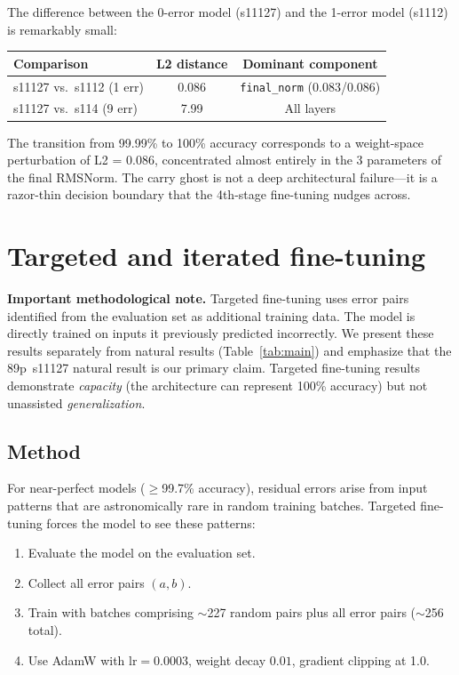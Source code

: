 \documentclass[11pt]{article}
\begin{document}
The difference between the 0-error model (s11127) and the 1-error model
(s1112) is remarkably small:

\begin{center}
\begin{tabular}{lcc}
\toprule
Comparison & L2 distance & Dominant component \\
\midrule
s11127 vs.\ s1112 (1 err) & 0.086 & \texttt{final\_norm} (0.083/0.086) \\
s11127 vs.\ s114 (9 err)  & 7.99  & All layers \\
\bottomrule
\end{tabular}
\end{center}

The transition from 99.99\% to 100\% accuracy corresponds to a
weight-space perturbation of L2 = 0.086, concentrated almost entirely in
the 3 parameters of the final RMSNorm. The carry ghost is not a deep
architectural failure---it is a razor-thin decision boundary that the
4th-stage fine-tuning nudges across.

\section{Targeted and iterated fine-tuning}
\label{sec:targeted}

\textbf{Important methodological note.} Targeted fine-tuning uses
error pairs identified from the evaluation set as additional training
data. The model is directly trained on inputs it previously predicted
incorrectly.
We present these results separately from natural results
(Table~\ref{tab:main}) and emphasize that the 89p~s11127 natural result
is our primary claim. Targeted fine-tuning results demonstrate
\emph{capacity} (the architecture can represent 100\% accuracy) but not
unassisted \emph{generalization}.

\subsection{Method}

For near-perfect models ($\geq$99.7\% accuracy), residual errors arise
from input patterns that are astronomically rare in random training
batches. Targeted fine-tuning forces the model to see these patterns:

\begin{enumerate}[leftmargin=*, itemsep=2pt]
  \item Evaluate the model on the evaluation set.
  \item Collect all error pairs $(a, b)$.
  \item Train with batches comprising $\sim$227 random pairs plus all
    error pairs ($\sim$256 total).
  \item Use AdamW with $\text{lr}=0.0003$, weight decay $0.01$, gradient
    clipping at 1.0.
\end{enumerate}
\end{document}
